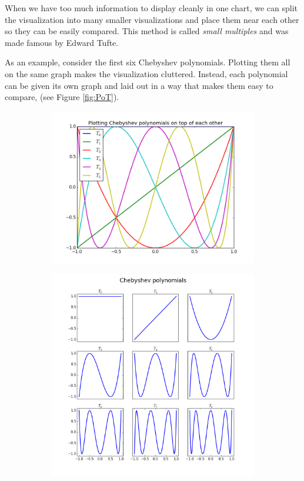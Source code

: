 When we have too much information to display cleanly in one chart, we can split the visualization into many smaller visualizations and place them near each other so they can be easily compared.
This method is called \emph{small multiples} and was made famous by Edward Tufte.

As an example, consider the first six Chebyshev polynomials.
Plotting them all on the same graph makes the visualization cluttered.
Instead, each polynomial can be given its own graph and laid out in a way that makes them easy to compare, (see Figure \ref{fig:PoT}).


\begin{figure} %
\centering
\begin{subfigure}{.45\textwidth}
  \centering
  \includegraphics[width=\textwidth]{PoT.png}
\end{subfigure}
\begin{subfigure}{.45\textwidth}
\centering
  \includegraphics[width=\textwidth]{PoT_separate.png}

\end{subfigure}
\end{figure}
